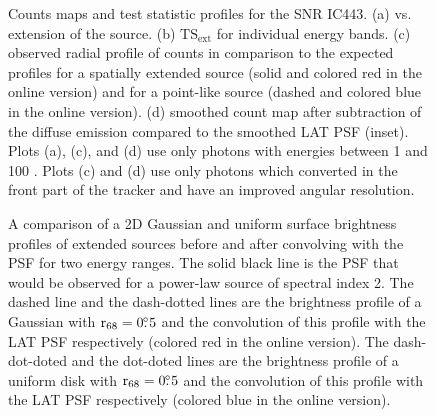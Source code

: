 \documentclass[12pt,preprint]{aastex}
\newif\ifcolorfigure
\newcommand{\gev}{\text{GeV}\xspace}
\newcommand{\tsext}{{\ensuremath{\text{TS}_{\text{ext}}}}\xspace}
\newcommand{\rsixeight}{{\ensuremath{\text{r}_{68}}}\xspace}
\newcommand{\ts}{\text{TS}\xspace}
\begin{document}


\clearpage
\begin{figure}
    \ifcolorfigure
    \plotone{ic443_plots/four_plots_ic443_color.eps}
    \else
    \fi
    \caption{
    Counts maps and test statistic profiles for the SNR IC443. (a) \ts
    vs. extension of the source. (b) \tsext for individual energy
    bands. (c) observed radial profile of counts in comparison to the
    expected profiles for a spatially extended source (solid and colored
    red in the online version) and for a point-like source (dashed and colored
    blue in the online version).  (d) smoothed count map after subtraction
    of the diffuse emission compared to the smoothed
    LAT PSF (inset).  Plots (a),
    (c), and (d) use only 
    photons with energies between
    1 \gev and 100 \gev.  Plots (c) and (d) use
    only photons which converted in the front part of the tracker and
    have an improved angular resolution.
    }
    \label{four_plots_ic443}
\end{figure}

\clearpage
\begin{figure}
    \ifcolorfigure
      \plotone{mc_plots/compare_disk_gauss_color.eps}
    \else
    \fi
    \caption{
    A comparison of a 2D Gaussian and uniform surface brightness profiles
    of extended sources before and after convolving with the PSF for two
    energy ranges.  The solid black line is the PSF that would be observed
    for a power-law source of spectral index 2. The dashed line
    and the dash-dotted lines are 
    the brightness profile of a Gaussian with $\rsixeight=0\fdg5$
    and the convolution of this profile with the LAT PSF respectively
    (colored red in the online version).
    The dash-dot-doted and the dot-doted lines are the brightness profile
    of a uniform disk with $\rsixeight=0\fdg5$ and the convolution
    of this profile with the LAT PSF respectively (colored blue in the online version).
    }\label{compare_disk_gauss}
  \end{figure}
\end{document}
